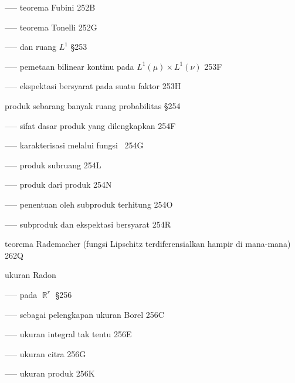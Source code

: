 ----- teorema Fubini 252B


----- teorema Tonelli 252G


----- dan ruang $L^1$ \S253

----- pemetaan bilinear kontinu pada $L^1(\mu)\times L^1(\nu)$ 253F


----- ekspektasi bersyarat pada suatu faktor 253H







produk sebarang banyak ruang probabilitas \S254

----- sifat dasar produk yang dilengkapkan 254F

----- karakterisasi melalui fungsi \imp\ 254G

----- produk subruang 254L

----- produk dari produk 254N

----- penentuan oleh subproduk terhitung 254O

----- subproduk dan ekspektasi bersyarat 254R



















\indexmedskip





















\indexmedskip

 teorema Rademacher (fungsi Lipschitz terdiferensialkan hampir di mana-mana) 262Q


 ukuran Radon


----- pada $\BbbR^r$ \S256

----- sebagai pelengkapan ukuran Borel 256C


----- ukuran integral tak tentu 256E


----- ukuran citra 256G


----- ukuran produk 256K




















